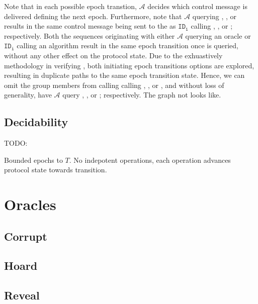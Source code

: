 Note that in each possible epoch transtion, \(\mathcal{A}\) decides which control message is delivered defining the next epoch.
Furthermore, note that \(\mathcal{A}\) querying , , or  results in the same control message being sent to the  as \(\mathtt{ID_i}\) calling , , or ; respectively.
Both the sequences originating with either \(\mathcal{A}\) querying an oracle or \(\mathtt{ID_i}\) calling an algorithm result in the same epoch transition once  is queried, without any other effect on the protocol state.
Due to the exhuastively methodology in verifying , both initiating epoch transitions options are explored, resulting in duplicate paths to the same epoch transition state.
Hence, we can omit the group members from calling calling , , or , and without loss of generality, have \(\mathcal{A}\) query , , or ; respectively.
The graph not looks like.

\hypertarget{decidability}{%
\subsection{Decidability}\label{decidability}}

TODO:

Bounded epochs to \(T\).
No indepotent operations, each operation advances protocol state towards transition.

\hypertarget{sec:game-oracles}{%
\section{Oracles}\label{sec:game-oracles}}

\hypertarget{corrupt}{%
\subsection{Corrupt}\label{corrupt}}

\hypertarget{hoard}{%
\subsection{Hoard}\label{hoard}}

\hypertarget{reveal}{%
\subsection{Reveal}\label{reveal}}


